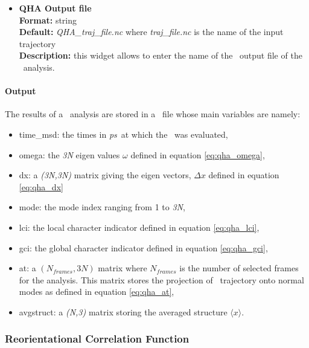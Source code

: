 \documentclass[a4paper,11pt]{report}
\newcommand{\ps}{\textit{ps}}
\begin{document}
\begin{itemize}
\hypertarget{qha_qha_output_file}{}
\item \textbf{QHA Output file}\\
\textbf{Format:} string\\
\textbf{Default:} \textit{QHA\_traj\_file.nc} where \textit{traj\_file.nc} is the name of the input trajectory\\
\textbf{Description:} this widget allows to enter the name of the \NetCDF\ output file of the \QHA\ analysis.
\end{itemize}

\paragraph{Output\\}
The results of a \QHA\ analysis are stored in a \NetCDF\ file whose main variables are namely:
\begin{itemize}
\item time\_msd: the times in \ps\ at which the \QHA\ was evaluated,
\item omega: the \textit{3N} eigen values $\omega$ defined in equation \ref{eq:qha_omega},
\item dx: a \textit{(3N,3N)} matrix giving the eigen vectors, $\Delta x$ defined in equation \ref{eq:qha_dx}
\item mode: the mode index ranging from 1 to \textit{3N},
\item lci: the local character indicator defined in equation \ref{eq:qha_lci},
\item gci: the global character indicator defined in equation \ref{eq:qha_gci},
\item at: a $(N_{frames},3N)$ matrix where $N_{frames}$ is the number of selected frames for the analysis. This matrix stores 
the projection of \MD\ trajectory onto normal modes as defined in equation \ref{eq:qha_at},
\item{avgstruct: a \textit{(N,3)} matrix storing the averaged structure $\langle x\rangle$}.
\end{itemize}

\subsubsection{Reorientational Correlation Function}
\label{rcf}
\end{document}
